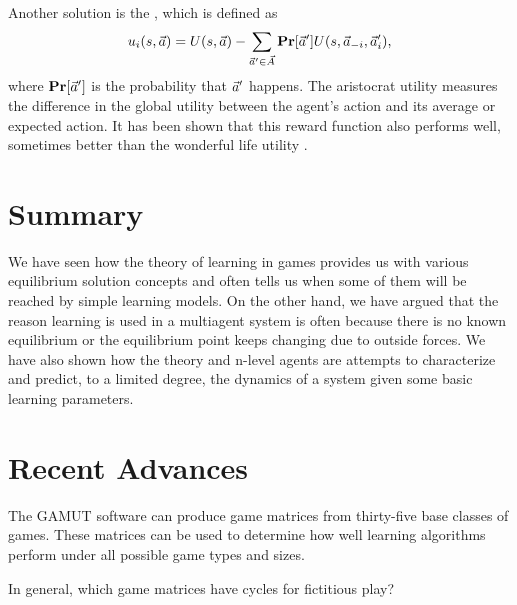 Another solution is the , which is defined as
\begin{equation}
  \label{eq:aristocrat}
  u_i(s,\vec{a}) = U(s, \vec{a}) - \sum_{\vec{a}' \in \vec{A}} \mathbf{Pr}[\vec{a}'] U(s,\vec{a}_{-i},\vec{a}'_i),
\end{equation}
where $\mathbf{Pr}[\vec{a}']$ is the probability that $\vec{a}'$ happens.
 The aristocrat utility measures the difference in the
global utility between the agent's action and its average or expected
action. It has been shown that this reward function also performs
well, sometimes better than the wonderful life utility
\cite{wolpert01a} .


\section{Summary}

We have seen how the theory of learning in games provides us with
various equilibrium solution concepts and often tells us when some of
them will be reached by simple learning models.  On the other hand, we
have argued that the reason learning is used in a multiagent system is
often because there is no known equilibrium or the equilibrium point
keeps changing due to outside forces. We have also shown how the
 theory and n-level agents are attempts to characterize and
predict, to a limited degree, the dynamics of a system given some
basic learning parameters.

\section{Recent Advances}
\label{sec:recent-advances}

The GAMUT \cite{nudelman04a} software can produce game matrices from
thirty-five base classes of games. These matrices can be used to
determine how well learning algorithms perform under all possible game
types and sizes.

\begin{exercises}
  \item In general, which game matrices have cycles for fictitious play?
\end{exercises}




